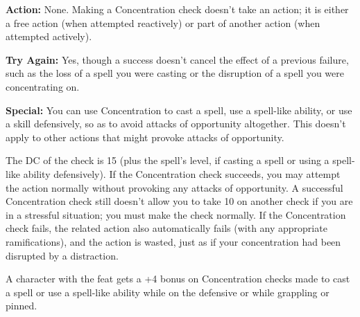 \textbf{Action:} None. Making a Concentration check doesn't take an action; it 
is either a free action (when attempted reactively) or part of another action (when 
attempted actively).

\textbf{Try Again:} Yes, though a success doesn't cancel the effect of a previous 
failure, such as the loss of a spell you were casting or the disruption of a spell 
you were concentrating on.

\textbf{Special:} You can use Concentration to cast a spell, use a spell-like ability, 
or use a skill defensively, so as to avoid attacks of opportunity altogether. This 
doesn't apply to other actions that might provoke attacks of opportunity.

The DC of the check is 15 (plus the spell's level, if casting a spell or using 
a spell-like ability defensively). If the Concentration check succeeds, you may 
attempt the action normally without provoking any attacks of opportunity. A successful 
Concentration check still doesn't allow you to take 10 on another check if you 
are in a stressful situation; you must make the check normally. If the Concentration 
check fails, the related action also automatically fails (with any appropriate 
ramifications), and the action is wasted, just as if your concentration had been 
disrupted by a distraction. 

A character with the  feat gets a +4 bonus on Concentration checks 
made to cast a spell or use a spell-like ability while on the defensive or while 
grappling or pinned.
